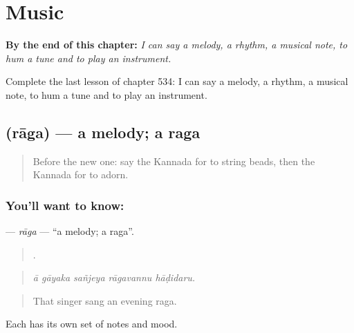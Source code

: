 
\chapter{Music}
\label{ch:ka-music}

\begin{chapteropening}
\textbf{By the end of this chapter:} \emph{I can say a melody, a rhythm, a musical note, to hum a tune and to play an instrument.}

Complete the last lesson of chapter 534: I can say a melody, a rhythm, a musical note, to hum a tune and to play an instrument.
\end{chapteropening}

\section[\texorpdfstring{\kn{ರಾಗ} (rāga)}{ರಾಗ (rāga)}]{ (rāga) — a melody; a raga}

\label{lesson:KA-C534-raga}



\begin{quote}
Before the new one: say the Kannada for to string beads, then the Kannada for to adorn.
\end{quote}

\subsection*{You'll want to know: }
\textbf{} — \emph{rāga} — \textquotedblleft{}a melody; a raga\textquotedblright{}.

\begin{quote}
    .
\end{quote}

\begin{quote}
\emph{ā gāyaka sañjeya rāgavannu hāḍidaru.}
\end{quote}

\begin{quote}
That singer sang an evening raga.
\end{quote}

Each  has its own set of notes and mood.

